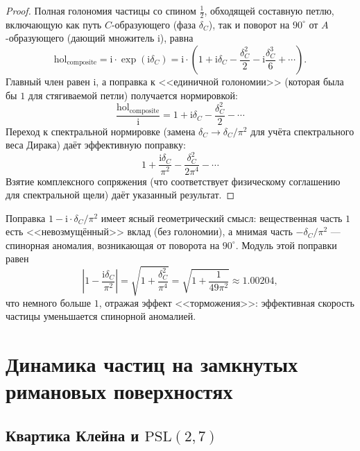 \documentclass[12pt,a4paper]{article}
\theoremstyle{definition}
\theoremstyle{remark}
\newcommand{\PSL}{\mathrm{PSL}}
\newcommand{\hol}{\mathrm{hol}}
\newcommand{\ii}{\mathrm{i}}
\begin{document}
\begin{proof}
Полная голономия частицы со спином $\frac{1}{2}$, обходящей составную петлю, включающую как путь $C$-образующего (фаза $\delta_C$), так и поворот на $90^\circ$ от $A$-образующего (дающий множитель $\ii$), равна
\begin{equation}
\hol_{\mathrm{composite}} = \ii \cdot \exp(\ii \delta_C) = \ii \cdot \left(1 + \ii\delta_C - \frac{\delta_C^2}{2} - \ii\frac{\delta_C^3}{6} + \cdots \right).
\end{equation}
Главный член равен $\ii$, а поправка к <<единичной голономии>> (которая была бы $1$ для стягиваемой петли) получается нормировкой:
\begin{equation}
\frac{\hol_{\mathrm{composite}}}{\ii} = 1 + \ii\delta_C - \frac{\delta_C^2}{2} - \cdots
\end{equation}
Переход к спектральной нормировке (замена $\delta_C \to \delta_C/\pi^2$ для учёта спектрального веса Дирака) даёт эффективную поправку:
\begin{equation}
1 + \frac{\ii\delta_C}{\pi^2} - \frac{\delta_C^2}{2\pi^4} - \cdots
\end{equation}
Взятие комплексного сопряжения (что соответствует физическому соглашению для спектральной щели) даёт указанный результат.
\end{proof}

Поправка $1 - \ii \cdot \delta_C/\pi^2$ имеет ясный геометрический смысл: вещественная часть $1$ есть <<невозмущённый>> вклад (без голономии), а мнимая часть $-\delta_C/\pi^2$ --- спинорная аномалия, возникающая от поворота на $90^\circ$. Модуль этой поправки равен
\begin{equation}
\left|1 - \frac{\ii \delta_C}{\pi^2}\right| = \sqrt{1 + \frac{\delta_C^2}{\pi^4}} = \sqrt{1 + \frac{1}{49\pi^2}} \approx 1.00204,
\end{equation}
что немного больше $1$, отражая эффект <<торможения>>: эффективная скорость частицы уменьшается спинорной аномалией.

\section{Динамика частиц на замкнутых римановых поверхностях}
\label{sec:dynamics}

\subsection{Квартика Клейна и $\PSL(2,7)$}
\end{document}
